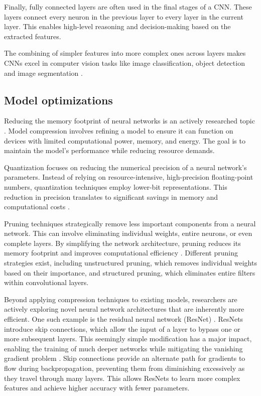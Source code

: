 Finally, fully connected layers are often used in the final stages of a CNN.
These layers connect every neuron in the previous layer to every layer in the current layer.
This enables high-level reasoning and decision-making based on the extracted features.

The combining of simpler features into more complex ones across layers makes CNNs excel in computer vision tasks like image classification, object detection and image segmentation \cite{krizhevskyImageNetClassificationDeep2017}.

\subsection{Model optimizations}
Reducing the memory footprint of neural networks is an actively researched topic \cite{neillOverviewNeuralNetwork2020, leEfficientNeuralNetworks2023}.
Model compression involves refining a model to ensure it can function on devices with limited computational power, memory, and energy.
The goal is to maintain the model's performance while reducing resource demands.

Quantization focuses on reducing the numerical precision of a neural network's parameters.
Instead of relying on resource-intensive, high-precision floating-point numbers, quantization techniques employ lower-bit representations.
This reduction in precision translates to significant savings in memory and computational costs \autocite{guoSurveyMethodsTheories2018}.

Pruning techniques strategically remove less important components from a neural network.
This can involve eliminating individual weights, entire neurons, or even complete layers.
By simplifying the network architecture, pruning reduces its memory footprint and improves computational efficiency \cite{blalockWhatStateNeural2020}.
Different pruning strategies exist, including unstructured pruning, which removes individual weights based on their importance, and structured pruning, which eliminates entire filters within convolutional layers.

Beyond applying compression techniques to existing models, researchers are actively exploring novel neural network architectures that are inherently more efficient.
One such example is the residual neural network (ResNet) \autocite{heDeepResidualLearning2015}.
ResNets introduce skip connections, which allow the input of a layer to bypass one or more subsequent layers.
This seemingly simple modification has a major impact, enabling the training of much deeper networks while mitigating the vanishing gradient problem \cite{pascanuDifficultyTrainingRecurrent2012}.
Skip connections provide an alternate path for gradients to flow during backpropagation, preventing them from diminishing excessively as they travel through many layers.
This allows ResNets to learn more complex features and achieve higher accuracy with fewer parameters. 

